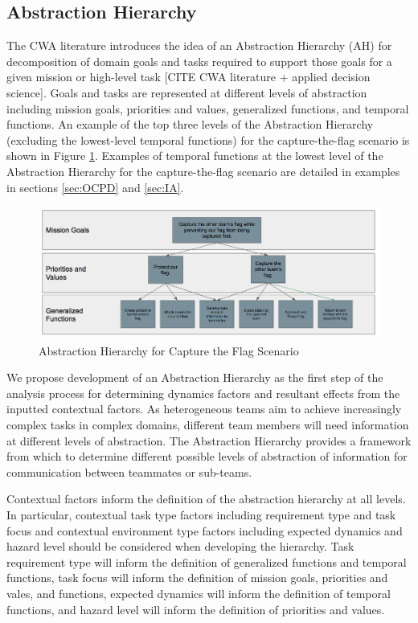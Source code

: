 \documentclass[letterpaper, 10 pt, conference]{ieeeconf}  %
\theoremstyle{definition}
\begin{document}
\subsection{Abstraction Hierarchy}
The CWA literature introduces the idea of an Abstraction Hierarchy (AH) for decomposition of domain goals and tasks required to support those goals for a given mission or high-level task [CITE CWA literature + applied decision science]. Goals and tasks are represented at different levels of abstraction including mission goals, priorities and values, generalized functions, and temporal functions. An example of the top three levels of the Abstraction Hierarchy (excluding the lowest-level temporal functions) for the capture-the-flag scenario is shown in Figure \ref{fig:ctfah}. Examples of temporal functions at the lowest level of the Abstraction Hierarchy for the capture-the-flag scenario are detailed in examples in sections \ref{sec:OCPD} and \ref{sec:IA}.

   
    \begin{figure}[tb]
    \centering
    \includegraphics[width=\textwidth]{ctfAH.png}
   \caption{Abstraction Hierarchy for Capture the Flag Scenario}
    \label{fig:ctfah}
    \end{figure}

We propose development of an Abstraction Hierarchy as the first step of the analysis process for determining dynamics factors and resultant effects from the inputted contextual factors. As heterogeneous teams aim to achieve increasingly complex tasks in complex domains, different team members will need information at different levels of abstraction. The Abstraction Hierarchy provides a framework from which to determine different possible levels of abstraction of information for communication between teammates or sub-teams. 

Contextual factors inform the definition of the abstraction hierarchy at all levels. In particular, contextual task type factors including requirement type and task focus and contextual environment type factors including expected dynamics and hazard level should be considered when developing the hierarchy. Task requirement type will inform the definition of generalized functions and temporal functions, task focus will inform the definition of mission goals, priorities and vales, and functions, expected dynamics will inform the definition of temporal functions, and hazard level will inform the definition of priorities and values. 
\end{document}
